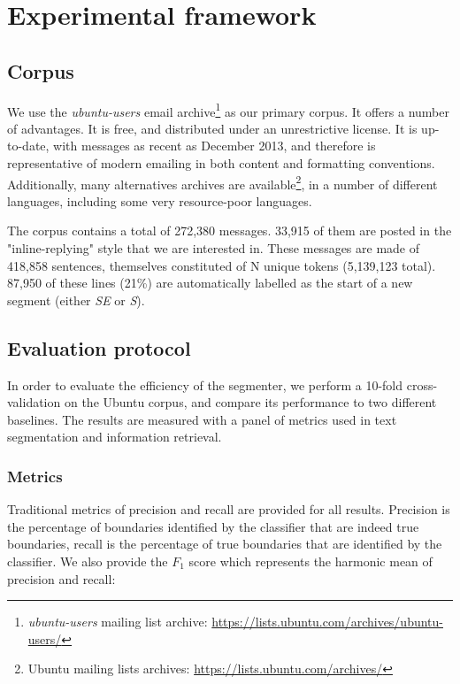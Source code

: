 
\section{Experimental framework}

\subsection{Corpus}

We use the \textit{ubuntu-users} email archive\footnote{\textit{ubuntu-users} mailing list archive: \url{https://lists.ubuntu.com/archives/ubuntu-users/}} as our primary corpus. It offers a number of advantages. It is free, and distributed under an unrestrictive license. It is up-to-date, with messages as recent as December 2013, and therefore is representative of modern emailing in both content and formatting conventions. Additionally, many alternatives archives are available\footnote{Ubuntu mailing lists archives: \url{https://lists.ubuntu.com/archives/}}, in a number of different languages, including some very resource-poor languages.

The corpus contains a total of 272,380 messages. 33,915 of them are posted in the "inline-replying" style that we are interested in. These messages are made of 418,858 sentences, themselves constituted of N unique tokens (5,139,123 total). 87,950 of these lines (21\%) are automatically labelled as the start of a new segment (either \textit{SE} or \textit{S}).

\subsection{Evaluation protocol}

In order to evaluate the efficiency of the segmenter, we perform a 10-fold cross-validation on the Ubuntu corpus, and compare its performance to two different baselines. The results are measured with a panel of metrics used in text segmentation and information retrieval.

\subsubsection{Metrics}

Traditional metrics of precision and recall are provided for all results. Precision is the percentage of boundaries identified by the classifier that are indeed true boundaries, recall is the percentage of true boundaries that are identified by the classifier. We also provide the $F_1$ score which represents the harmonic mean of precision and recall:

